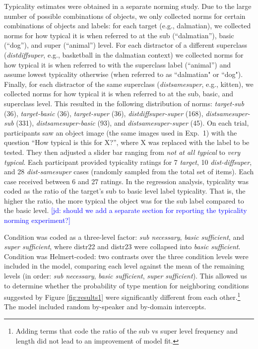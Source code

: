 \documentclass[10pt,letterpaper]{article}
\newcommand{\jd}[1]{\textcolor{Blue}{[jd: #1]}}
\newcommand{\figref}[1]{Figure \ref{#1}}
\begin{document}
Typicality estimates were obtained in a separate norming study. Due to the large number of possible combinations of objects, we only collected norms for certain combinations of objects and labels: for each target (e.g., dalmatian), we collected norms for how typical it is when referred to at the sub (``dalmatian''), basic (``dog''), and super (``animal'') level. For each distractor of a different superclass (\emph{distdiffsuper}, e.g., basketball in the dalmatian context) we collected norms for how typical it is when referred to with the superclass label (``animal'') and assume lowest typicality otherwise (when referred to as ``dalmatian" or ``dog"). Finally, for each distractor of the same superclass (\emph{distsamesuper}, e.g., kitten), we collected norms for how typical it is when referred to at the sub, basic, and superclass level. This resulted in the following distribution of norms:  \emph{target-sub} (36), \emph{target-basic} (36), \emph{target-super} (36), \emph{distdiffsuper-super} (168), \emph{distsamesuper-sub} (331), \emph{distsamesuper-basic} (93), and \emph{distsamesuper-super} (45). On each trial, participants saw an object image (the same images used in Exp.~1) with the question ``How typical is this for X?'', where X was replaced with the label to be tested. They then adjusted a slider bar ranging from \emph{not at all typical} to \emph{very typical}. Each participant provided typicality ratings for 7 \emph{target}, 10 \emph{dist-diffsuper}, and 28 \emph{dist-samesuper} cases (randomly sampled from the total set of items). Each case received between 6 and 27 ratings. In the regression analysis, typicality was coded as the ratio of the target's sub to basic level label typicality. That is, the higher the ratio, the more typical the object was for the sub label compared to the basic level. \jd{should we add a separate section for reporting the typicality norming experiment?}

Condition was coded as a three-level factor: \emph{sub necessary}, \emph{basic sufficient}, and \emph{super sufficient}, where distr22 and distr23 were collapsed into \emph{basic sufficient}. Condition was Helmert-coded: two contrasts over the three condition levels were included in the model, comparing each level against the mean of the remaining levels (in order: \emph{sub necessary}, \emph{basic sufficient}, \emph{super sufficient}). This allowed us to determine whether the probability of type mention  for neighboring conditions suggested by \figref{fig:results1} were significantly different from each other.\footnote{Adding terms that code the ratio of the sub vs super level frequency and length did not lead to an improvement of model fit.} The model included random by-speaker and by-domain intercepts. 
\end{document}
